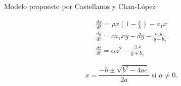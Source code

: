 \documentclass{wscpaperproc}
\theoremstyle{wsc}
\begin{document}
\begin{center}
	Modelo propuesto por Castellanos y Chan-López
\end{center}
\begin{equation} \label{Holling1y2_Castellanos}
	\begin{gathered}
		\frac{d x}{d t}=\rho x\left(1-\frac{x}{k}\right)-a_1 x \\
		\frac{d y}{d t}=c a_1 x y-d y-\frac{a_2 y z}{y+b_2} \\
		\frac{d z}{d t}=\alpha z^2-\frac{\beta z^2}{y+b_2}
	\end{gathered}
\end{equation}


\begin{equation} \label{eq:quadraticsol}
	x = \frac{-b \pm \sqrt{b^2-4ac}}{2a} \mbox{ si } a \ne 0.
\end{equation}
\end{document}
